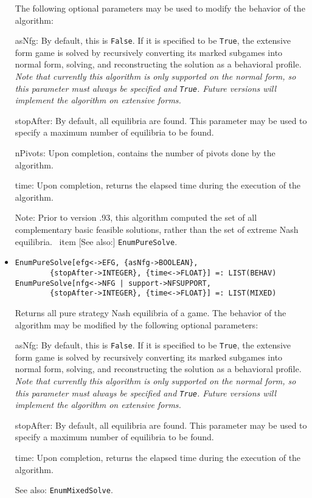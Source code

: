 \begin{itemize}
The following optional parameters may be used to modify the behavior
of the algorithm:
\bd
\item
[asNfg:] By default, this is \verb+False+.  If it is specified to be
\verb+True+, the extensive form game is solved by recursively converting
its marked subgames into normal form, solving, and reconstructing the
solution as a behavioral profile.  {\it Note that currently this algorithm
is only supported on the normal form, so this parameter
must always be specified and {\tt True}.  Future versions will implement
the algorithm on extensive forms.}
\item
[stopAfter:] By default, all equilibria are found.  This parameter may
be used to specify a maximum number of equilibria to be found.
\item
[nPivots:] Upon completion, contains the number of pivots done by the
algorithm.
\item
[time:] Upon completion, returns the elapsed time during the execution
of the algorithm.
\ed
\item
[Note:] Prior to version .93, this algorithm computed the set of all
complementary basic feasible solutions, rather than the set of extreme
Nash equilibria.  \
item
[See also:] {\tt EnumPureSolve}.
\ed

\item
\protect \large \begin{verbatim}
EnumPureSolve[efg<->EFG, {asNfg->BOOLEAN},
        {stopAfter->INTEGER}, {time<->FLOAT}] =: LIST(BEHAV)
EnumPureSolve[nfg<->NFG | support->NFSUPPORT,
        {stopAfter->INTEGER}, {time<->FLOAT}] =: LIST(MIXED) 
\end{verbatim}\normalsize

\bd
Returns all pure strategy Nash equilibria of a game.  The behavior
of the algorithm may be modified by the following optional parameters:
\bd
\item
[asNfg:] By default, this is \verb+False+.  If it is specified to be
\verb+True+, the extensive form game is solved by recursively converting
its marked subgames into normal form, solving, and reconstructing the
solution as a behavioral profile.  {\it Note that currently this algorithm
is only supported on the normal form, so this parameter
must always be specified and {\tt True}.  Future versions will implement
the algorithm on extensive forms.}
\item
[stopAfter:] By default, all equilibria are found.  This parameter may
be used to specify a maximum number of equilibria to be found.
\item
[time:] Upon completion, returns the elapsed time during the execution
of the algorithm.
\ed
\item
[See also:] {\tt EnumMixedSolve}.
\ed


\end{itemize}
